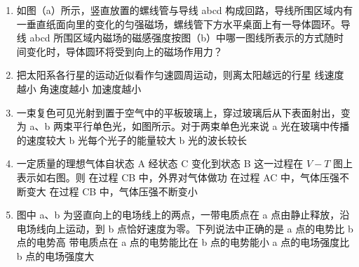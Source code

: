 \documentclass[\gkver]{gaokaozhenti}
\begin{document}
\begin{enumerate}
\item
如图（a）所示，竖直放置的螺线管与导线 abcd 构成回路，导线所围区域内有一垂直纸面向里的变化的匀强磁场，螺线管下方水平桌面上有一导体圆环。导线 abcd 所围区域内磁场的磁感强度按图（b）中哪一图线所表示的方式随时间变化时，导体圆环将受到向上的磁场作用力？
\onepicture[w=12cm]{}

\item
把太阳系各行星的运动近似看作匀速圆周运动，则离太阳越远的行星
{线速度越小}
{角速度越小}
{加速度越小}

\item
一束复色可见光射到置于空气中的平板玻璃上，穿过玻璃后从下表面射出，变为 a、b 两束平行单色光，如图所示。对于两束单色光来说
\onepicture[w=4.5cm]{}
{a 光在玻璃中传播的速度较大}
{b 光每个光子的能量较大}
{b 光的波长较长}

\item
一定质量的理想气体自状态 A 经状态 C 变化到状态 B 这一过程在 $V-T$ 图上表示如右图。则
\onepicture[w=5cm]{}
{在过程 CB 中，外界对气体做功}
{在过程 AC 中，气体压强不断变大}
{在过程 CB 中，气体压强不断变小}

\item
图中 a、b 为竖直向上的电场线上的两点，一带电质点在 a 点由静止释放，沿电场线向上运动，到 b 点恰好速度为零。下列说法中正确的是
\onepicture[h=4.5cm]{}
{a 点的电势比 b 点的电势高}
{带电质点在 a 点的电势能比在 b 点的电势能小}
{a 点的电场强度比 b 点的电场强度大}


\end{enumerate}
\end{document}
